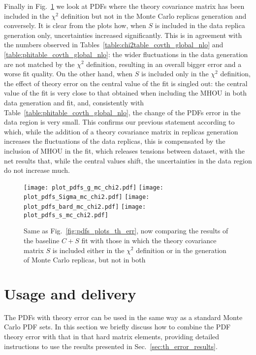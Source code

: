     Finally in Fig.~\ref{fig:pdfs_plots_th_err_mc_chi2} we look at PDFs where the theory covariance matrix has been
    included in the $\chi^2$ definition but not in the Monte Carlo replicas generation and conversely.
    It is clear from the plots how, when $S$ is included in the data replica generation only, 
    uncertainties increased significantly. This is in agreement with the numbers observed in 
    Tables~\ref{table:chi2table_covth_global_nlo} and \ref{table:phitable_covth_global_nlo}: the wider fluctuations 
    in the data generation are not matched by the $\chi^2$ definition, resulting in an overall bigger error and a worse
    fit quality.
    On the other hand, when $S$ is included only in the $\chi^2$ definition, the effect of theory error on
    the central value of the fit is singled out: the central value of the fit is very close to that obtained 
    when including the MHOU in both data generation and fit, and, consistently with Table~\ref{table:phitable_covth_global_nlo},
    the change of the PDFs error in the data region is very small.
    This confirms our previous statement according to which, while the addition of a theory covariance matrix
    in replicas generation increases the fluctuations of the data replicas, this is compensated by the inclusion of MHOU
    in the fit, which releases tensions between dataset, with the net results that, while the central values shift, 
    the uncertainties in the data region do not increase much.
    \begin{figure}[t!]
        \begin{center}
            \texttt{[image: plot\_pdfs\_g\_mc\_chi2.pdf]}
            \texttt{[image: plot\_pdfs\_Sigma\_mc\_chi2.pdf]}
            \texttt{[image: plot\_pdfs\_bard\_mc\_chi2.pdf]}
            \texttt{[image: plot\_pdfs\_s\_mc\_chi2.pdf]}
            \caption{Same as Fig.~\ref{fig:pdfs_plots_th_err}, now comparing the results of the baseline $C + S$
            fit with those in which the theory covariance matrix $S$ is included
            either in the $\chi^2$ definition or in the generation of Monte Carlo replicas, but not in both} 
            \label{fig:pdfs_plots_th_err_mc_chi2} 
        \end{center}
    \end{figure}

    \section{Usage and delivery}
    \label{sec:th_error_usage}
    The PDFs with theory error can be used in the same way as a standard Monte Carlo PDF sets.
    In this section we briefly discuss how to combine the PDF theory error with that in that hard matrix elements,
    providing detailed instructions to use the results presented in Sec.~\ref{sec:th_error_results}. 

